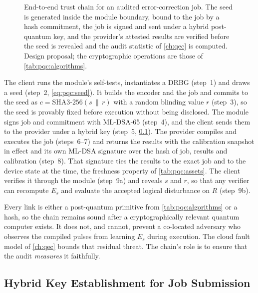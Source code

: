 \begin{figure}[htbp]
\caption{End-to-end trust chain for an audited error-correction job. The seed is generated inside the module boundary, bound to the job by a hash commitment, the job is signed and sent under a hybrid post-quantum key, and the provider's attested results are verified before the seed is revealed and the audit statistic of \cref{ch:qec} is computed. Design proposal; the cryptographic operations are those of \cref{tab:pqc:algorithms}.}
\label{fig:pqc:trustchain}
\end{figure}

The client runs the module's self-tests, instantiates a DRBG (step~1) and draws a seed (step~2, \cref{eq:pqc:seed}). It builds the encoder and the job and commits to the seed as $c=\mathrm{SHA3\text{-}256}(s\,\|\,r)$ with a random blinding value $r$ (step~3), so the seed is provably fixed before execution without being disclosed. The module signs job and commitment with ML-DSA-65 (step~4), and the client sends them to the provider under a hybrid key (step~5, \cref{sec:pqc:hybrid}). The provider compiles and executes the job (steps~6--7) and returns the results with the calibration snapshot in effect and its own ML-DSA signature over the hash of job, results and calibration (step~8). That signature ties the results to the exact job and to the device state at the time, the freshness property of \cref{tab:pqc:assets}. The client verifies it through the module (step~9a) and reveals $s$ and $r$, so that any verifier can recompute $E_s$ and evaluate the accepted logical disturbance on $R$ (step~9b).

Every link is either a post-quantum primitive from \cref{tab:pqc:algorithms} or a hash, so the chain remains sound after a cryptographically relevant quantum computer exists. It does not, and cannot, prevent a co-located adversary who observes the compiled pulses from learning $E_s$ during execution. The cloud fault model of \cref{ch:qec} bounds that residual threat. The chain's role is to ensure that the audit \emph{measures} it faithfully.

\subsection{Hybrid Key Establishment for Job Submission}\label{sec:pqc:hybrid}

